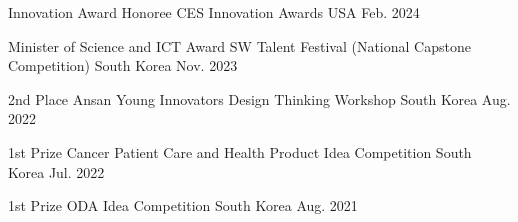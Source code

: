 



\begin{cvhonors}

  \cvhonor
    {Innovation Award Honoree} %
    {CES Innovation Awards} %
    {USA} %
    {Feb. 2024} %

\end{cvhonors}




\begin{cvhonors}

  \cvhonor
    {Minister of Science and ICT Award} %
    {SW Talent Festival (National Capstone Competition)} %
    {South Korea} %
    {Nov. 2023} %

  \cvhonor
    {2nd Place} %
    {Ansan Young Innovators Design Thinking Workshop} %
    {South Korea} %
    {Aug. 2022} %

  \cvhonor
    {1st Prize} %
    {Cancer Patient Care and Health Product Idea Competition} %
    {South Korea} %
    {Jul. 2022} %

  \cvhonor
    {1st Prize} %
    {ODA Idea Competition} %
    {South Korea} %
    {Aug. 2021} %
\end{cvhonors}

